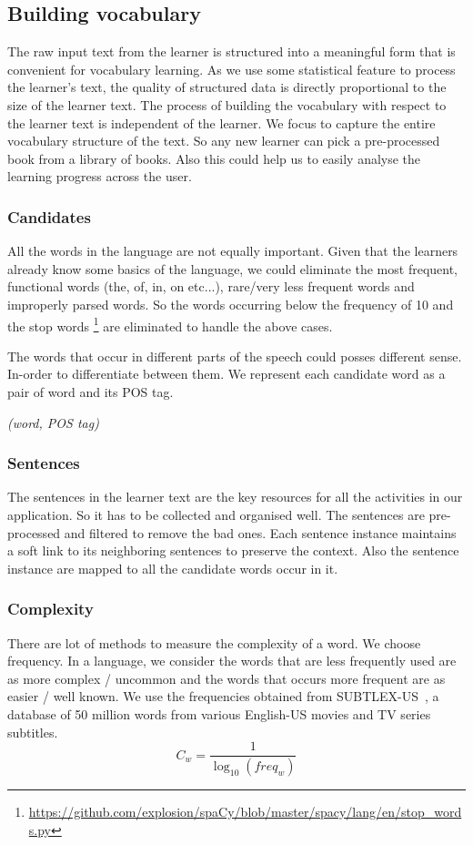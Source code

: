 \documentclass[11pt,a4paper]{article}
\begin{document}
\subsection{Building vocabulary}
The raw input text from the learner is structured into a meaningful form that is
convenient for vocabulary learning. As we use some statistical feature to
process the learner's text, the quality of structured data is directly
proportional to the size of the learner text. The process of building the
vocabulary with respect to the learner text is independent of the learner. We focus
to capture the entire vocabulary structure of the text. So any new learner can
pick a pre-processed book from a library of books. Also this could help us to easily
analyse the learning progress across the user.

\subsubsection{Candidates}
All the words in the language are not equally important. Given that the learners
already know some basics of the language, we could eliminate the most frequent, 
functional words (the, of, in, on etc...), rare/very less frequent words and
improperly parsed words. So the words occurring below the frequency of 10 and
the stop words \footnote{\url{https://github.com/explosion/spaCy/blob/master/spacy/lang/en/stop_words.py}}
are eliminated to handle the above cases.

The words that occur in different parts of the speech could posses different sense.
In-order to differentiate between them. We represent each candidate word as a
pair of word and its POS tag.
\begin{center}\emph{(word, POS tag)}\end{center}

\subsubsection{Sentences}

The sentences in the learner text are the key resources for all the activities in our application.
So it has to be collected and organised well. The sentences are pre-processed and filtered to remove the bad ones.
Each sentence instance maintains a soft link to its neighboring sentences to preserve the context.
Also the sentence instance are mapped to all the candidate words occur in it.

\subsubsection{Complexity}
There are lot of methods to measure the complexity of a word. We choose frequency.
In a language, we consider the words that are less frequently used are as
more complex / uncommon and the words that occurs more frequent are as easier / well known.
We use the frequencies obtained from SUBTLEX-US~\citet{brysbaert2009moving}, a database of 50 million
words from various English-US movies and TV series subtitles.
\begin{equation}
  C_w = \frac{1}{\log_{10}(freq_w)}
\end{equation}
\end{document}
